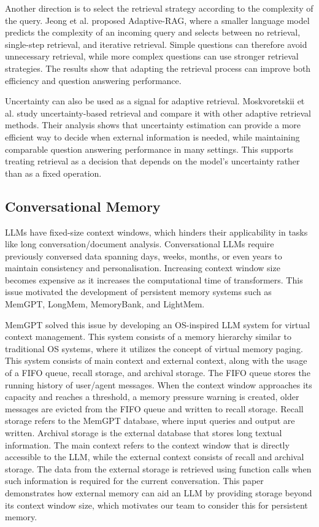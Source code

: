Another direction is to select the retrieval strategy according to the complexity of the query. Jeong et al. proposed Adaptive-RAG, where a smaller language model predicts the complexity of an incoming query and selects between no retrieval, single-step retrieval, and iterative retrieval. Simple questions can therefore avoid unnecessary retrieval, while more complex questions can use stronger retrieval strategies. The results show that adapting the retrieval process can improve both efficiency and question answering performance.

Uncertainty can also be used as a signal for adaptive retrieval. Moskvoretskii et al. study uncertainty-based retrieval and compare it with other adaptive retrieval methods. Their analysis shows that uncertainty estimation can provide a more efficient way to decide when external information is needed, while maintaining comparable question answering performance in many settings. This supports treating retrieval as a decision that depends on the model's uncertainty rather than as a fixed operation.


\subsection{Conversational Memory}

LLMs have fixed-size context windows, which hinders their applicability in tasks like long conversation/document analysis. Conversational LLMs require previously conversed data spanning days, weeks, months, or even years to maintain consistency and personalisation. Increasing context window size becomes expensive as it increases the computational time of transformers. This issue motivated the development of persistent memory systems such as MemGPT, LongMem, MemoryBank, and LightMem. \cite{packer2023memgpt,wang2023longmem,zhong2024memorybank,fang2025lightmem}

MemGPT solved this issue by developing an OS-inspired LLM system for virtual context management. This system consists of a memory hierarchy similar to traditional OS systems, where it utilizes the concept of virtual memory paging. This system consists of main context and external context, along with the usage of a FIFO queue, recall storage, and archival storage. The FIFO queue stores the running history of user/agent messages. When the context window approaches its capacity and reaches a threshold, a memory pressure warning is created, older messages are evicted from the FIFO queue and written to recall storage. Recall storage refers to the MemGPT database, where input queries and output are written. Archival storage is the external database that stores long textual information. The main context refers to the context window that is directly accessible to the LLM, while the external context consists of recall and archival storage. The data from the external storage is retrieved using function calls when such information is required for the current conversation. This paper demonstrates how external memory can aid an LLM by providing storage beyond its context window size, which motivates our team to consider this for persistent memory. \cite{packer2023memgpt}

